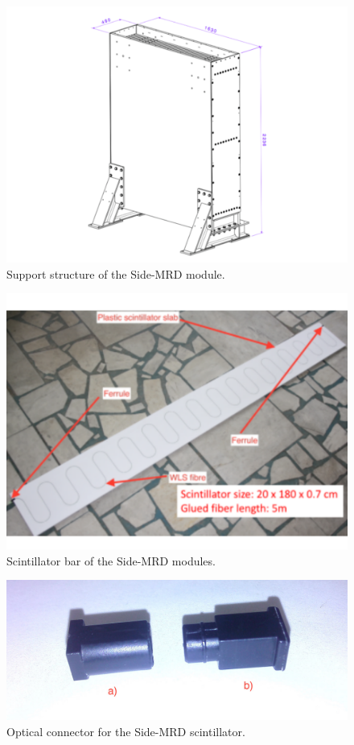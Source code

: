 \begin{figure}[tbh]
\begin{center}
\includegraphics[width=0.8\linewidth]{fig/side_mrd_structure.pdf}
\end{center}
\caption{
Support structure of the Side-MRD module.
}
\label{fig:side_mrd_support_structure}
\end{figure}

\begin{figure}[tbh]
\begin{center}
\includegraphics[width=0.8\linewidth]{fig/side_mrd_scintillator.pdf}
\end{center}
\caption{
Scintillator bar of the Side-MRD modules.
}
\label{fig:side_mrd_scintillator}
\end{figure}

\begin{figure}[tbh]
\begin{center}
\includegraphics[width=0.8\linewidth]{fig/side_mrd_optical_con.pdf}
\end{center}
\caption{
Optical connector for the Side-MRD scintillator.
}
\label{fig:side_mrd_optical_con}
\end{figure}


